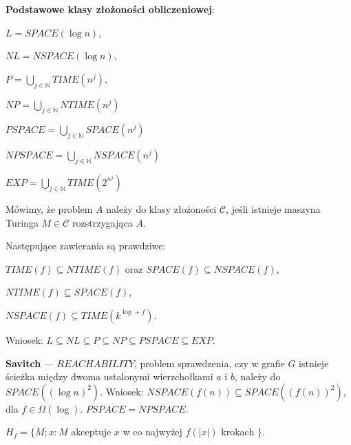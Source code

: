 \begin{definicja}
    \textbf{Podstawowe klasy złożoności obliczeniowej}:
    \begin{itemize*}[label={}]
        \item $L = SPACE(\log n)$,
        \item $NL = NSPACE(\log n)$,
        \item $P = \bigcup_{j \in \mathbb{N}} TIME(n^j)$,
        \item $NP = \bigcup_{j \in \mathbb{N}} NTIME(n^j)$
        \item $PSPACE = \bigcup_{j \in \mathbb{N}} SPACE(n^j)$
        \item $NPSPACE = \bigcup_{j \in \mathbb{N}} NSPACE(n^j)$
        \item $EXP = \bigcup_{j \in \mathbb{N}} TIME(2^{n^j})$
    \end{itemize*}
\end{definicja}

\begin{definicja}
    Mówimy, że problem $A$ należy do klasy złożoności $\mathcal{C}$, jeśli istnieje
    maszyna Turinga $M \in \mathcal{C}$ rozstrzygająca $A$.
\end{definicja}

\begin{twierdzenie}
    Następujące zawierania są prawdziwe:
    \begin{itemize*}[label={}]
        \item $TIME(f) \subseteq NTIME(f)$ oraz $SPACE(f)\subseteq NSPACE(f)$,
        \item $NTIME(f) \subseteq SPACE(f)$,
        \item $NSPACE(f) \subseteq TIME(k^{\log + f})$.
    \end{itemize*}
    Wniosek: $L \subseteq NL \subseteq P \subseteq NP \subseteq PSPACE \subseteq EXP$.
\end{twierdzenie}

\begin{twierdzenie}
    \textbf{Savitch} --- $REACHABILITY$, problem sprawdzenia, czy w grafie $G$ istnieje ścieżka między dwoma ustalonymi wierzchołkami $a$ i $b$, należy do $SPACE((\log n)^2)$. Wniosek: $NSPACE(f(n)) \subseteq SPACE((f(n))^2)$, dla $f \in \Omega(\log)$. $PSPACE = NPSPACE$.
\end{twierdzenie}

\begin{definicja}
    $H_f = \{ M; x : M$ akceptuje $x$ w co najwyżej $f(|x|)$ krokach $\}$.
\end{definicja}

